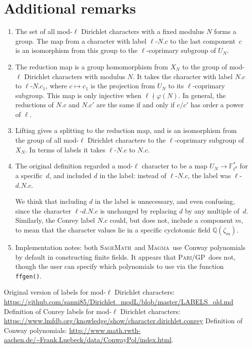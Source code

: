 \documentclass[a4paper, 10pt]{amsart}
\def\Q{{\mathbb Q}}
\def\Fld{{\mathbb F}_{\ell^d}}
\newcommand{\software}[1]{\textsc{#1}{}}
\newcommand{\Sage}{\software{SageMath}}
\newcommand{\Magma}{\software{Magma}}
\newcommand{\GP}{\software{Pari/GP}}
\newcommand{\CLab}[2]{$#1.#2$}
\newcommand{\DLab}[3]{$#1$-$#2.#3$}
\newcommand{\oldDLab}[4]{$#1$-$#2.#3.#4$}
\begin{document}
\section{Additional remarks}
\begin{enumerate}
\item
  The set of all mod-$\ell$ Dirichlet characters with a fixed modulus
  $N$ forms a group.  The map from a character with label
  \DLab{\ell}{N}{c} to the last component~$c$ is an isomorphism from
  this group to the $\ell$-coprimary subgroup of $ U_N$.
\item
  The reduction map is a group homomorphism from $X_N$ to the group
  of mod-$\ell$ Dirichlet characters with modulus $N$.  It takes the
  character with label \CLab{N}{c} to \DLab{\ell}{N}{c_1}, where
  $c\mapsto c_1$ is the projection from $ U_N$ to its $\ell$-coprimary
  subgroup.  This map is only injective when $\ell\nmid\varphi(N)$.
  In general, the reductions of \CLab{N}{c} and \CLab{N}{c'} are the
  same if and only if $c/c'$ has order a power of $\ell$.
\item
  Lifting gives a splitting to the reduction map, and is an
  isomorphism from the group of all mod-$\ell$ Dirichlet characters to
  the $\ell$-coprimary subgroup of $X_N$. In terms of labels it
  takes \DLab{\ell}{N}{c} to \CLab{N}{c}.
\item
  The original definition regarded a mod-$\ell$ character to be a map
  $ U_N\to\Fld^*$ for a specific~$d$, and included $d$ in the label:
  instead of \DLab{\ell}{N}{c}, the label was \oldDLab{\ell}{d}{N}{c}.

  We think that including $d$ in the label is unnecessary, and even
  confusing, since the character \oldDLab{\ell}{d}{N}{c} is unchanged
  by replacing $d$ by any multiple of~$d$.  Similarly, the Conrey
  label \CLab{N}{c} could, but does not, include a component $m$,
  to mean that the character values lie in a specific cyclotomic field
  $\Q(\zeta_m)$.

\item
  Implementation notes: both \Sage\ and \Magma\ use Conway polynomials
  by default in constructing finite fields.  It appears that \GP\ does
  not, though the user can specify which polynomials to use via the
  function \texttt{ffgen()}.
\end{enumerate}

\begin{thebibliography}{99}
 Original version of labels for mod-$\ell$ Dirichlet
  characters:
  \url{https://github.com/sanni85/Dirichlet_modL/blob/master/LABELS_old.md}
  Definition of Conrey labels for mod-$\ell$ Dirichlet characters:
  \url{https://www.lmfdb.org/knowledge/show/character.dirichlet.conrey}
 Definition of Conway polynomials:
  \url{http://www.math.rwth-aachen.de/~Frank.Luebeck/data/ConwayPol/index.html}.
\end{thebibliography}
\end{document}
